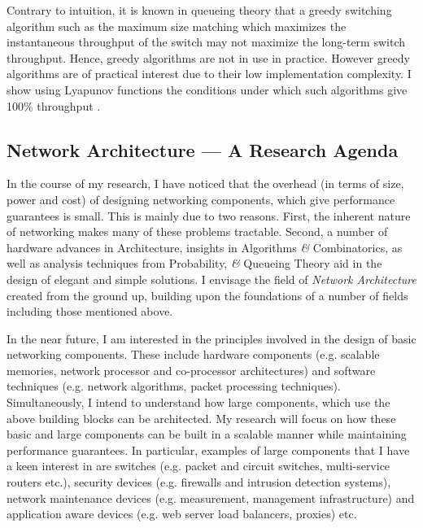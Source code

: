\documentclass[a4paper, 10pt]{article}
\begin{document}
\begin{small}
\begin{enumerate}

Contrary to intuition, it is known in queueing theory that a greedy
switching algorithm such as the maximum size matching which
maximizes the instantaneous throughput of the switch may not
maximize the long-term switch throughput. Hence, greedy algorithms
are not in use in practice.
However greedy algorithms are of practical interest due to their low implementation complexity.
I show using Lyapunov functions the conditions under which
such algorithms give 100\% throughput \cite{msm}.

\end{enumerate}


\subsection*{Network Architecture ---  A Research Agenda}

   In the course of my research, I have noticed that the overhead (in terms
of size, power and cost) of designing networking components, which give 
performance guarantees is small. 
This is mainly due to two reasons. First, the inherent nature of 
networking makes many of these problems tractable. Second, a number of
hardware advances in Architecture, insights in Algorithms {\it \&} Combinatorics, 
as well as analysis techniques from Probability, {\it \&} Queueing Theory 
aid in the design of elegant and simple solutions.
I envisage the field of {\it Network Architecture} created from the 
ground up, building upon the foundations of a number of fields
including those mentioned above.


In the near future, I am interested in the 
principles involved in the design of basic networking 
components. These include
hardware components (e.g. scalable memories, 
network processor and co-processor architectures) and 
software techniques (e.g. network algorithms, packet processing 
techniques). 
  Simultaneously, I intend to understand how large components, which use
the above building blocks can be architected.
My research will focus on how these basic and large
components can be built in a scalable manner while maintaining 
performance guarantees. 
In particular, examples of large components that I have a keen
interest in are switches 
(e.g. packet and circuit switches, multi-service routers etc.), 
security devices (e.g. firewalls and intrusion detection 
systems), network maintenance devices (e.g. measurement,
management infrastructure) and application aware devices
(e.g. web server load balancers, proxies) etc. 


\end{small}
\end{document}
